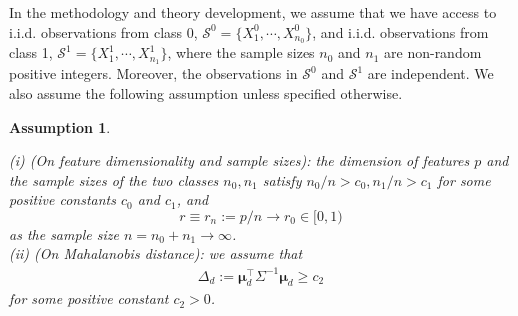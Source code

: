 \documentclass[12pt]{article}
\numberwithin{equation}{section}
\newtheorem{assumption}{Assumption}
\theoremstyle{remark}
\newcommand{\1}{{\rm 1}\kern-0.24em{\rm I}}
\begin{document}
 In the methodology and theory development, we assume that we have access to i.i.d. observations from class 0, $\mathcal{S}^0=\{X^0_1, \cdots, X^0_{n_0}\}$, and i.i.d. observations from class 1, $\mathcal{S}^1=\{X^1_1, \cdots, X^1_{n_1}\}$, where the sample sizes $n_0$ and $n_1$ are non-random positive integers. Moreover, the observations in $\mathcal{S}^0$ and $\mathcal{S}^1$ are independent.  We also assume the following assumption unless specified otherwise.
\begin{assumption}\label{asm}
 
(i) (On feature dimensionality and sample sizes): the dimension of features $p$ and the sample sizes of the  two classes $n_0, n_1$ satisfy  $n_0/n> c_0, n_1/n>c_1$ for some positive constants $c_0$ and $c_1$, and 
$$r\equiv r_n:=p/n\to  r_0 \in [0,1) $$ 
as the sample size $n=n_0+n_1\to \infty$. 
\\
(ii) (On Mahalanobis distance): we assume that
\begin{align}\label{def:Mahala_dis}
\varDelta_{d} :={\bm{\mu}}_d^{\top} \Sigma^{-1} {\bm{\mu}}_d \geq c_2\end{align}
for some positive constant $c_2>0$.

\end{assumption}
\end{document}
